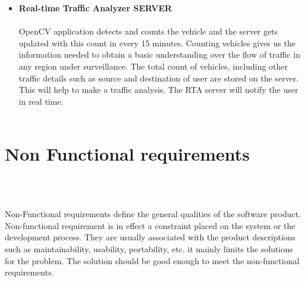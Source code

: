 \begin{itemize}
\item \textbf{Real-time Traffic Analyzer SERVER}\\ \\
OpenCV application detects and counts the vehicle and the server gets updated with this count in every 15 minutes. Counting vehicles gives us the information needed to obtain a basic understanding over the flow of traffic in any region under surveillance. The total count of vehicles, including other traffic details such as source and destination of user are stored on the server. This will help to make a traffic analysis. The RTA server will notify the user in real time.\\ \\

\end{itemize}
\section{Non Functional requirements}
\\ \\
\par Non-Functional requirements define the general qualities of the software product. Non-functional requirement is in effect a constraint placed on the system or the development process. They are usually associated with the product descriptions such as maintainability, usability, portability, etc. it mainly limits the solutions for the problem. The solution should be good enough to meet the non-functional requirements.\\ 
\\

